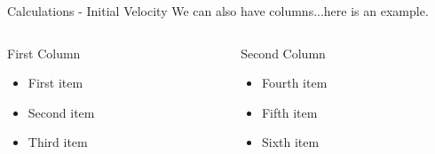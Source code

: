 \documentclass{beamer}  %
\begin{document}
\begin{frame}{Calculations - Initial Velocity}
 We can also have columns...here is an example. 

\begin{columns} %
 
 \begin{column}{0.50\textwidth} %
  \begin{block}{First Column} %
   \begin{itemize}
     \item First item
     \item Second item
     \item Third item
   \end{itemize}
  \end{block}
 \end{column}

 \begin{column}{0.50\textwidth} %
  \begin{block}{Second Column}
   \begin{itemize}
    \item Fourth item
    \item Fifth item
    \item Sixth item
   \end{itemize}
  \end{block}
 \end{column}

\end{columns}

\end{frame}
\end{document}
